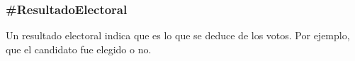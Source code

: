 \subsubsection{\#ResultadoElectoral}

Un resultado electoral indica que es lo que se deduce de los
votos. Por ejemplo, que el candidato fue elegido o no.

\begin{description}
  
\end{description}